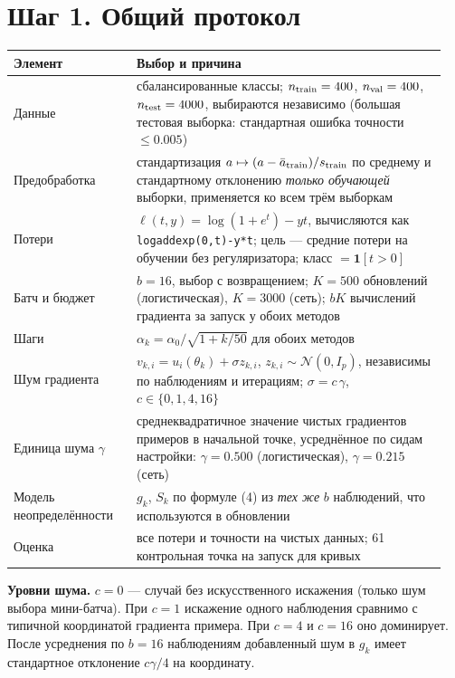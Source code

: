 \documentclass[11pt,a4paper]{article}
\begin{document}
\section*{Шаг 1. Общий протокол}

\begin{center}
\small
\begin{tabular}{@{}p{0.27\linewidth}p{0.68\linewidth}@{}}
\toprule
Элемент & Выбор и причина \\
\midrule
Данные & сбалансированные классы; $n_{\rm train}=400$, $n_{\rm val}=400$, $n_{\rm test}=4000$,
выбираются независимо (большая тестовая выборка: стандартная ошибка точности $\le0.005$) \\
Предобработка & стандартизация $a\mapsto(a-\bar a_{\rm train})/s_{\rm train}$ по среднему и
стандартному отклонению \emph{только обучающей} выборки, применяется ко всем трём выборкам \\
Потери & $\ell(t,y)=\log(1+e^t)-yt$, вычисляются как \texttt{logaddexp(0,t)-y*t}; цель —
средние потери на обучении без регуляризатора; класс $=\mathbf 1[t>0]$ \\
Батч и бюджет & $b=16$, выбор с возвращением; $K=500$ обновлений (логистическая), $K=3000$
(сеть); $bK$ вычислений градиента за запуск у обоих методов \\
Шаги & $\alpha_k=\alpha_0/\sqrt{1+k/50}$ для обоих методов \\
Шум градиента & $v_{k,i}=u_i(\theta_k)+\sigma z_{k,i}$, $z_{k,i}\sim\mathcal N(0,I_p)$, независимы
по наблюдениям и итерациям; $\sigma=c\,\gamma$, $c\in\{0,1,4,16\}$ \\
Единица шума $\gamma$ & среднеквадратичное значение чистых градиентов примеров в начальной
точке, усреднённое по сидам настройки: $\gamma=0.500$ (логистическая), $\gamma=0.215$ (сеть) \\
Модель неопределённости & $g_k$, $S_k$ по формуле (4) из \emph{тех же} $b$ наблюдений, что
используются в обновлении \\
Оценка & все потери и точности на чистых данных; 61 контрольная точка на запуск для кривых \\
\bottomrule
\end{tabular}
\end{center}

\textbf{Уровни шума.} $c=0$ — случай без искусственного искажения (только шум выбора
мини-батча). При $c=1$ искажение одного наблюдения сравнимо с типичной координатой градиента
примера. При $c=4$ и $c=16$ оно доминирует. После усреднения по $b=16$ наблюдениям добавленный
шум в $g_k$ имеет стандартное отклонение $c\gamma/4$ на координату.
\end{document}
